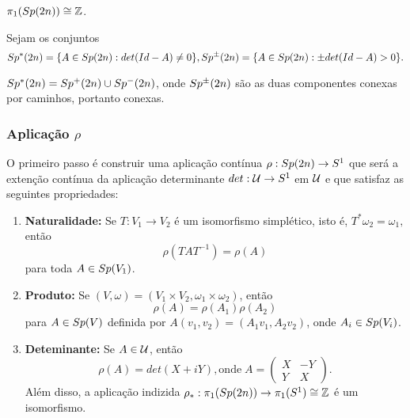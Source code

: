 \documentclass{beamer}
\begin{document}
\begin{footnotesize}
\begin{frame}
\begin{enumerate}
		\end{enumerate}
		
		\begin{teorema}
			$\pi_{1}(Sp(2n)) \cong \mathbb{Z}$.
			
		\end{teorema}
		
		Sejam os conjuntos $$Sp^{*}(2n) = \{ A \in Sp(2n): det(Id-A)\neq 0 \},
		Sp^{\pm}(2n) = \{ A \in Sp(2n): \pm det(Id-A)> 0 \}. 
		$$
		
		\begin{lema}
			$Sp^{*}(2n) = Sp^{+}(2n)\cup Sp^{-}(2n)$, onde $Sp^{\pm}(2n)$ são as duas componentes conexas por caminhos, portanto conexas.
		\end{lema}
		
		
	\end{frame}
	
	\begin{frame}
		\frametitle{Aplicação $\rho$}
		
		O primeiro passo é construir uma aplicação contínua $\rho: Sp(2n)\to S^{1}$ que será a extenção contínua da aplicação determinante $det:\mathcal{U}\to S^{1}$ em $\mathcal{U}$ e que satisfaz as seguintes propriedades:
		
		\begin{scriptsize}
			\begin{enumerate}
				\item \textbf{Naturalidade:}  Se $T:V_{1} \to V_{2}$ é um isomorfismo simplético, isto é, $T^{*}\omega_{2} = \omega_{1}, $então 
				$$
				\rho(TAT^{-1}) = \rho(A)
				$$
				para toda $A\in Sp(V_{1})$.
				
				\item \textbf{Produto:} Se $(V,\omega) = (V_{1}\times V_{2},\omega_{1}\times \omega_{2})$, então
				$$
				\rho(A) = \rho(A_{1})\rho(A_{2})
				$$
				para $A\in Sp(V)$ definida por $A(v_{1}, v_{2})=(A_{1}v_{1}, A_{2}v_{2})$, onde $A_{i} \in Sp(V_{i})$.
			
			
			\item \textbf{Deteminante:} Se $A\in \mathcal{U}$, então 
			$$
			\rho(A) = det(X+iY), \text{onde} \;	
			A=\left(
			\begin{array}{cc}
			X & -Y					\\
			Y & X
			\end{array}
			\right).
			$$
			Além disso, a aplicação indizida $\rho_{*}: \pi_{1}(Sp(2n)) \to \pi_{1}(S^{1}) \cong \mathbb{Z}$ é um isomorfismo.
			

\end{enumerate}
\end{scriptsize}
\end{frame}
\end{footnotesize}
\end{document}
